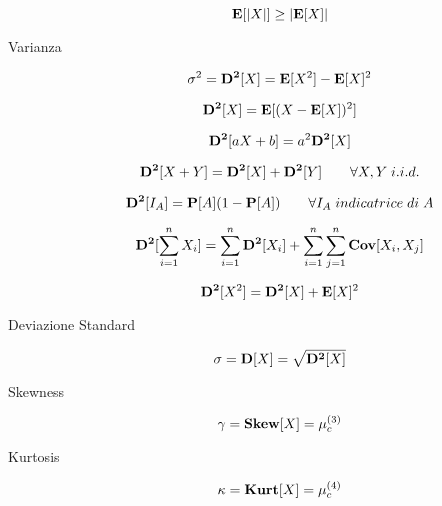 \begin{description}
		\begin{equation}
		\mathbf{E}[|X|]\geq|\mathbf{E}[X]|
		\end{equation}
		
	\item [Varianza]
		\begin{equation}
		\sigma^{2} = \mathbf{D^{2}}[X] = \mathbf{E}[X^{2}]-\mathbf{E}[X]^{2}
		\end{equation}

		\begin{equation}
		\mathbf{D^{2}}[X] = \mathbf{E}[(X-\mathbf{E}[X])^{2}]
		\end{equation}
		
		\begin{equation}
		\mathbf{D^{2}}[aX+b] = a^{2}\mathbf{D^{2}}[X]
		\end{equation}
		
		\begin{equation}
		\mathbf{D^{2}}[X+Y] = \mathbf{D^{2}}[X]+\mathbf{D^{2}}[Y] \qquad\forall X,Y \; i.i.d.
		\end{equation}
		
		\begin{equation}
		\mathbf{D^{2}}[I_{A}] = \mathbf{P}[A](1-\mathbf{P}[A]) \qquad\forall I_{A} \; indicatrice \; di \; A
		\end{equation}
		
		\begin{equation}
		\mathbf{D^{2}}[\sum_{i=1}^{n}X_{i}] = \sum_{i=1}^{n}\mathbf{D^{2}}[X_{i}] + \sum_{i=1}^{n}\sum_{j=1}^{n}\mathbf{Cov}[X_{i},X_{j}]
		\end{equation}
		
		\begin{equation}
		\mathbf{D^{2}}[X^{2}] = \mathbf{D^{2}}[X]+\mathbf{E}[X]^{2}
		\end{equation}
	
	\item [Deviazione Standard]
		\begin{equation}
		\sigma = \mathbf{D}[X] = \sqrt{\mathbf{D^{2}}[X]}
		\end{equation}

	\item [Skewness]
		\begin{equation}
		\gamma = \mathbf{Skew}[X] = \mu_{c}^{(3)}
		\end{equation}		
		
	\item [Kurtosis]
		\begin{equation}
		\kappa = \mathbf{Kurt}[X] = \mu_{c}^{(4)}
		\end{equation}
	

\end{description}

